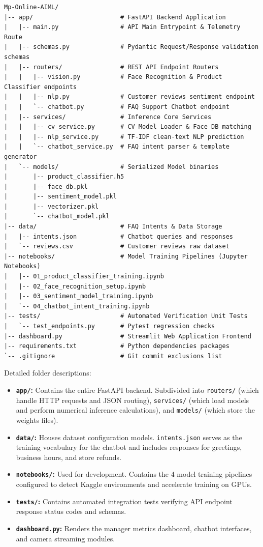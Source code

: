 \documentclass[12pt,a4paper]{article}
\begin{document}
\begin{lstlisting}[caption=Project Directory Tree]
Mp-Online-AIML/
|-- app/                        # FastAPI Backend Application
|   |-- main.py                 # API Main Entrypoint & Telemetry Route
|   |-- schemas.py              # Pydantic Request/Response validation schemas
|   |-- routers/                # REST API Endpoint Routers
|   |   |-- vision.py           # Face Recognition & Product Classifier endpoints
|   |   |-- nlp.py              # Customer reviews sentiment endpoint
|   |   `-- chatbot.py          # FAQ Support Chatbot endpoint
|   |-- services/               # Inference Core Services
|   |   |-- cv_service.py       # CV Model Loader & Face DB matching
|   |   |-- nlp_service.py      # TF-IDF clean-text NLP prediction
|   |   `-- chatbot_service.py  # FAQ intent parser & template generator
|   `-- models/                 # Serialized Model binaries
|       |-- product_classifier.h5
|       |-- face_db.pkl
|       |-- sentiment_model.pkl
|       |-- vectorizer.pkl
|       `-- chatbot_model.pkl
|-- data/                       # FAQ Intents & Data Storage
|   |-- intents.json            # Chatbot queries and responses
|   `-- reviews.csv             # Customer reviews raw dataset
|-- notebooks/                  # Model Training Pipelines (Jupyter Notebooks)
|   |-- 01_product_classifier_training.ipynb
|   |-- 02_face_recognition_setup.ipynb
|   |-- 03_sentiment_model_training.ipynb
|   `-- 04_chatbot_intent_training.ipynb
|-- tests/                      # Automated Verification Unit Tests
|   `-- test_endpoints.py       # Pytest regression checks
|-- dashboard.py                # Streamlit Web Application Frontend
|-- requirements.txt            # Python dependencies packages
`-- .gitignore                  # Git commit exclusions list
\end{lstlisting}

Detailed folder descriptions:
\begin{itemize}
    \item \textbf{\texttt{app/}:} Contains the entire FastAPI backend. Subdivided into \texttt{routers/} (which handle HTTP requests and JSON routing), \texttt{services/} (which load models and perform numerical inference calculations), and \texttt{models/} (which store the weights files).
    \item \textbf{\texttt{data/}:} Houses dataset configuration models. \texttt{intents.json} serves as the training vocabulary for the chatbot and includes responses for greetings, business hours, and store refunds.
    \item \textbf{\texttt{notebooks/}:} Used for development. Contains the 4 model training pipelines configured to detect Kaggle environments and accelerate training on GPUs.
    \item \textbf{\texttt{tests/}:} Contains automated integration tests verifying API endpoint response status codes and schemas.
    \item \textbf{\texttt{dashboard.py}:} Renders the manager metrics dashboard, chatbot interfaces, and camera streaming modules.
\end{itemize}
\end{document}
